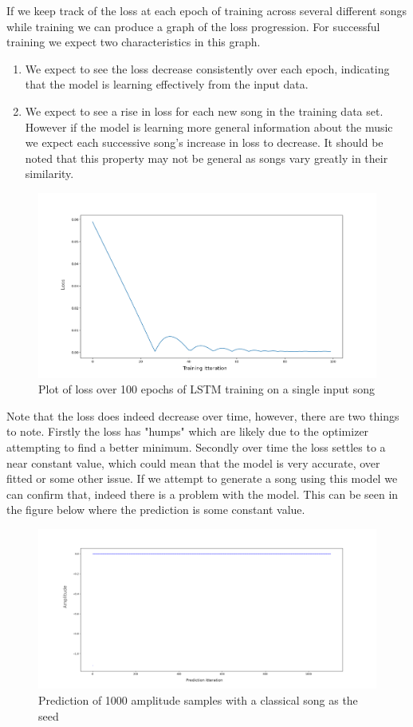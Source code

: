 \documentclass{article}
\begin{document}
If we keep track of the loss at each epoch of training across several different songs while training we can produce a graph of the loss progression. For successful training we expect two characteristics in this graph.
\begin{enumerate}
\item We expect to see the loss decrease consistently over each epoch, indicating that the model is learning effectively from the input data.
\item We expect to see a rise in loss for each new song in the training data set. However if the model is learning more general information about the music we expect each successive song's increase in loss to decrease. It should be noted that this property may not be general as songs vary greatly in their similarity.
\end{enumerate}
\begin{figure}[H]
\centering
\caption{Plot of loss over 100 epochs of LSTM training on a single input song}
\includegraphics[scale=0.35]{loss_plot_100itr.png}
\end{figure}
Note that the loss does indeed decrease over time, however, there are two things to note. Firstly the loss has "humps" which are likely due to the optimizer attempting to find a better minimum. Secondly over time the loss settles to a near constant value, which could mean that the model is very accurate, over fitted or some other issue. If we attempt to generate a song using this model we can confirm that, indeed there is a problem with the model. This can be seen in the figure below where the prediction is some constant value. 
\begin{figure}[H]
\caption{Prediction of 1000 amplitude samples with a classical song as the seed}
\includegraphics[scale=0.35]{overfit_1.png}
\end{figure}
\end{document}
